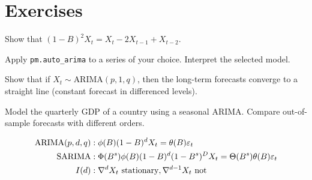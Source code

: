 \section{Exercises}

\begin{exercise}[$\star$]
Show that $(1-B)^2 X_t = X_t - 2X_{t-1}+X_{t-2}$.
\end{exercise}

\begin{exercise}[$\star$]
Apply \texttt{pm.auto\_arima} to a series of your choice. Interpret the selected model.
\end{exercise}

\begin{exercise}[$\star\star$]
Show that if $X_t\sim\text{ARIMA}(p,1,q)$, then the long-term forecasts converge to a straight line (constant forecast in differenced levels).
\end{exercise}

\begin{exercise}
Model the quarterly GDP of a country using a seasonal ARIMA. Compare out-of-sample forecasts with different orders.
\end{exercise}

\begin{keyformulas}
\begin{align*}
\text{ARIMA}(p,d,q) &: \phi(B)(1-B)^d X_t = \theta(B)\varepsilon_t \\
\text{SARIMA} &: \Phi(B^s)\phi(B)(1-B)^d(1-B^s)^D X_t = \Theta(B^s)\theta(B)\varepsilon_t \\
I(d) &: \nabla^d X_t\text{ stationary}, \nabla^{d-1}X_t\text{ not}
\end{align*}
\end{keyformulas}

